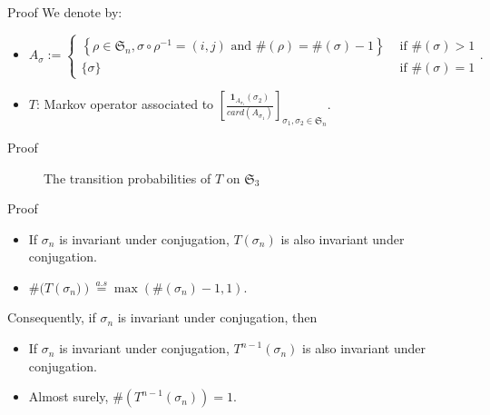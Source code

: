 \documentclass[english,xcolor=table]{beamer}
\begin{document}
\begin{frame}{Proof}
We denote by:
\begin{itemize}
    \item $A_\sigma:=
    \begin{cases}
        \left\{\rho\in\mathfrak{S}_n, \sigma\circ\rho^{-1}=(i,j)  \text{ and }  \#(\rho)=\#(\sigma)-1 \right\} & \text{ if } \#(\sigma)>1
        \\ \{\sigma\} & \text{ if } \#(\sigma)=1
    \end{cases}.
    $
    \item $T$: Markov operator associated to  $\left[\frac{\mathbf{1}_{A_{\sigma_1}}(\sigma_2)}{card(A_{\sigma_1})}\right]_{\sigma_1,\sigma_2\in \mathfrak{S}_n}$.
\end{itemize}

\end{frame}
\begin{frame}{Proof}
\begin{figure}[H]
\centering
{}
    \caption{The transition probabilities of $T$ on $\mathfrak{S}_3$}
    \label{figm}
\end{figure}
\end{frame}
\begin{frame}{Proof}
    \begin{itemize}
        \item If $\sigma_n$ is invariant under conjugation, $T(\sigma_n)$ is also invariant under conjugation.
        \item $
\#(T \left(\sigma_{n})\right)\overset{a.s}{=}\max(\#(\sigma_n)-1,1). $  
    \end{itemize}
    Consequently, if $\sigma_n$ is invariant under conjugation, then 
    \begin{itemize}
        \item If $\sigma_n$ is invariant under conjugation, $T^{n-1}(\sigma_n)$ is also invariant under conjugation.
        \item Almost surely, $\#\left(T^{n-1}(\sigma_n)\right)=1$.
    \end{itemize}
\end{frame}
\end{document}
